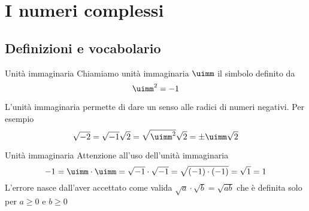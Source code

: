 \chapter{I numeri complessi}
\label{cha:INumeriComplessi}
\section{Definizioni e vocabolario}
\label{sec:NumCompDefinizioniVocabolario}
\begin{definizionet}{Unità immaginaria}{}
	Chiamiamo unità immaginaria $\uimm$ il simbolo definito da \[\uimm^2=-1\]  
\end{definizionet}
L'unità immaginaria permette di dare un senso alle radici di numeri negativi. Per esempio \[\sqrt{-2}=\sqrt{-1}\sqrt{2}=\sqrt{\uimm^2}\sqrt{2}=\pm\uimm\sqrt{2}\]
\begin{cesempiot}{Unità immaginaria}{}
Attenzione all'uso dell'unità immaginaria
\[-1=\uimm\cdot\uimm=\sqrt{-1}\cdot\sqrt{-1}=\sqrt{(-1)\cdot(-1)}=\sqrt{1}=1 \]L'errore nasce dall'aver accettato come valida $\sqrt{a}\cdot\sqrt{b}=\sqrt{ab}$ che è definita solo per $a\geq 0$ e $b\geq 0$
\end{cesempiot}
